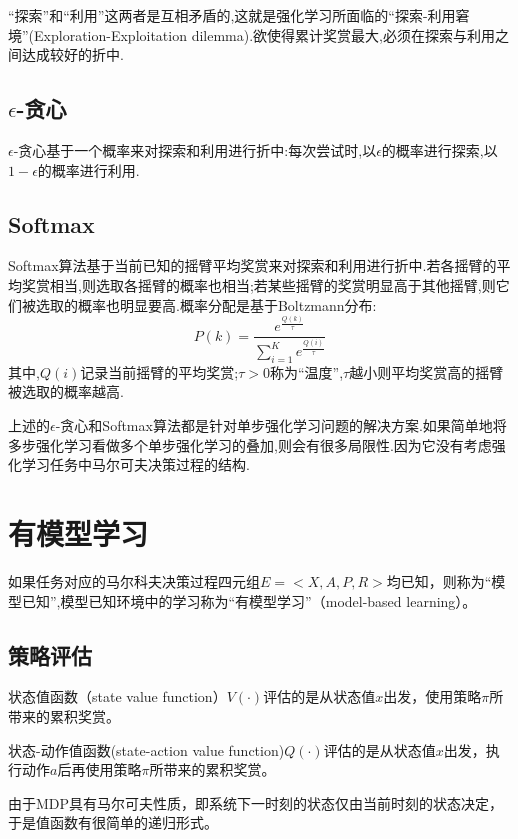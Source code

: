 ``探索''和``利用''这两者是互相矛盾的,这就是强化学习所面临的``探索-利用窘境''(Exploration-Exploitation dilemma).欲使得累计奖赏最大,必须在探索与利用之间达成较好的折中.

\subsection{$\epsilon$-贪心}

$\epsilon$-贪心基于一个概率来对探索和利用进行折中:每次尝试时,以$\epsilon$的概率进行探索,以$1-\epsilon$的概率进行利用.

\subsection{Softmax}

Softmax算法基于当前已知的摇臂平均奖赏来对探索和利用进行折中.若各摇臂的平均奖赏相当,则选取各摇臂的概率也相当;若某些摇臂的奖赏明显高于其他摇臂,则它们被选取的概率也明显要高.概率分配是基于Boltzmann分布:
$$P(k)=\frac{e^\frac{Q(k)}{\tau}}{\sum_{i=1}^Ke^\frac{Q(i)}{\tau}}$$
其中,$Q(i)$记录当前摇臂的平均奖赏;$\tau>0$称为``温度'',$\tau$越小则平均奖赏高的摇臂被选取的概率越高.

上述的$\epsilon$-贪心和Softmax算法都是针对单步强化学习问题的解决方案.如果简单地将多步强化学习看做多个单步强化学习的叠加,则会有很多局限性.因为它没有考虑强化学习任务中马尔可夫决策过程的结构.

\section{有模型学习}

如果任务对应的马尔科夫决策过程四元组$E=<X,A,P,R>$均已知，则称为``模型已知'',模型已知环境中的学习称为``有模型学习''（model-based learning）。

\subsection{策略评估}

状态值函数（state value function）$V(\cdot)$评估的是从状态值$x$出发，使用策略$\pi$所带来的累积奖赏。

状态-动作值函数(state-action value function)$Q(\cdot)$评估的是从状态值$x$出发，执行动作$a$后再使用策略$\pi$所带来的累积奖赏。

由于MDP具有马尔可夫性质，即系统下一时刻的状态仅由当前时刻的状态决定，于是值函数有很简单的递归形式。

